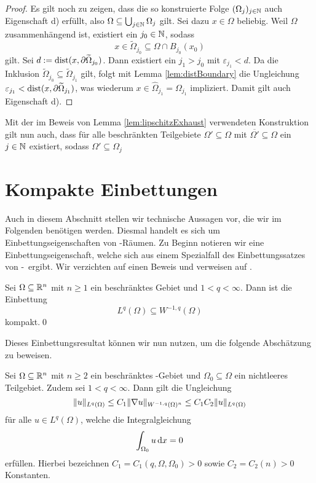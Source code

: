\begin{proof}
  Es gilt noch zu zeigen, dass die so konstruierte Folge $(\Omega_j)_{j \in \mathbb{N}}$ auch Eigenschaft d) erfüllt, also $ \Omega \subseteq \bigcup_{j \in \mathbb{N}} \Omega_j $ gilt.
  Sei dazu $x \in \Omega$ beliebig.
  Weil $\Omega$ zusammenhängend ist, existiert ein $j_0 \in \mathbb{N}$, sodass
  $$
  x \in \widetilde\Omega_{j_0} \subseteq \Omega \cap B_{j_0}(x_0)
  $$
  gilt.
  Sei $d:=\operatorname{dist}(x, \partial\widetilde\Omega_{j_0})$.
  Dann existiert ein $j_1 > j_0$ mit $\varepsilon_{j_1} < d$.
  Da die Inklusion $\widetilde\Omega_{j_0} \subseteq \widetilde\Omega_{j_1}$ gilt, folgt mit Lemma \ref{lem:distBoundary} die Ungleichung $\varepsilon_{j_1} < \operatorname{dist}(x,\partial\widetilde\Omega_{j_1})$, was wiederum $x \in \widehat\Omega_{j_1} = \Omega_{j_1}$ impliziert.
  Damit gilt auch Eigenschaft d).
\end{proof}

\begin{bemnumber}
  \label{bem:boundedSubset}
  Mit der im Beweis von Lemma \ref{lem:lipschitzExhaust} verwendeten Konstruktion gilt nun auch, dass für alle beschränkten Teilgebiete $\Omega' \subseteq \Omega$ mit $\overline{\Omega'} \subseteq \Omega$ ein $j \in \mathbb{N}$ existiert, sodass $\Omega' \subseteq \Omega_j$
\end{bemnumber}

\section{Kompakte Einbettungen}

Auch in diesem Abschnitt stellen wir technische Aussagen vor, die wir im Folgenden benötigen werden.
Diesmal handelt es sich um Einbettungseigenschaften von \sobolev\hyp{}Räumen.
Zu Beginn notieren wir eine Einbettungseigenschaft, welche sich aus einem Spezialfall des Einbettungssatzes von \rellich\hyp{}\kondrachov\ ergibt. 
Wir verzichten auf einen Beweis und verweisen auf \cite[S.168, Theorem 6.3]{adams2003sobolev}.

\begin{lem}
  \label{lem:compactEmbedding0}
  Sei $\Omega \subseteq \mathbb{R}^n$ mit $n \geq 1$ ein beschränktes Gebiet und $1 < q < \infty$.
  Dann ist die Einbettung
  $$
  L^q(\Omega) \subseteq W^{-1,q}(\Omega)
  $$
  kompakt.\qed
\end{lem}

Dieses Einbettungsresultat können wir nun nutzen, um die folgende Abschätzung zu beweisen.

\begin{lem}
  \label{lem:compactEmbedding}
  Sei $\Omega \subseteq \mathbb{R}^n$ mit $n \geq 2$ ein beschränktes \lipschitz\hyp{}Gebiet und $\Omega_0 \subseteq \Omega$ ein nichtleeres Teilgebiet.
  Zudem sei $1 < q < \infty$.
  Dann gilt die Ungleichung
  \begin{equation}
    \label{eq:compactInequality}
    \lVert u \rVert_{L^q(\Omega)} 
    \leq C_1 \lVert \nabla u \rVert_{W^{-1,q}(\Omega)^n}
    \leq C_1 C_2 \lVert u \rVert_{L^q(\Omega)}
  \end{equation}
  für alle $u \in L^q(\Omega)$, welche die Integralgleichung
  $$
  \int_{\Omega_0} u \, {\operatorname{d}\!{x}} = 0
  $$
  erfüllen.
  Hierbei bezeichnen $C_1 = C_1(q, \Omega, \Omega_0) > 0$ sowie $C_2 = C_2(n) > 0$ Konstanten.
\end{lem}

